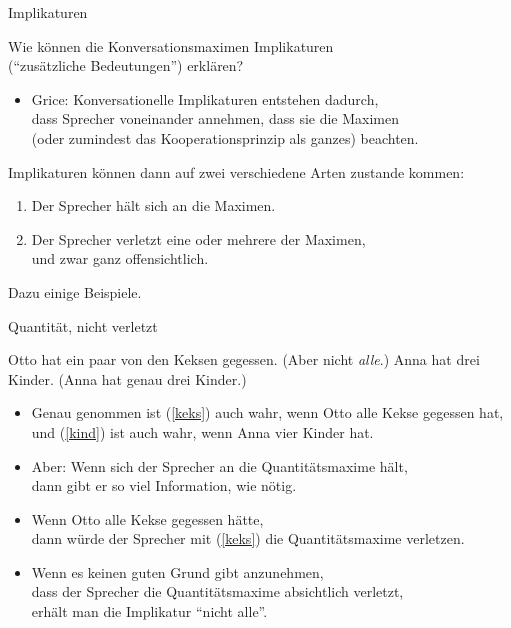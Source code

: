 \begin{frame}{Implikaturen}

Wie können die Konversationsmaximen Implikaturen\\ ("`zusätzliche Bedeutungen"') erklären?

\begin{itemize}
\item Grice: Konversationelle Implikaturen entstehen dadurch,\\
      dass Sprecher voneinander annehmen, dass sie die Maximen\\
     (oder zumindest das Kooperationsprinzip als ganzes) beachten.
\end{itemize}\pause

Implikaturen können dann auf zwei verschiedene Arten zustande kommen:

\begin{enumerate}
\item Der Sprecher hält sich an die Maximen.\pause
\item Der Sprecher verletzt eine oder mehrere der Maximen,\\ und zwar ganz offensichtlich.\pause
\end{enumerate}

Dazu einige Beispiele.

\end{frame}



\begin{frame}{Quantität, nicht verletzt}

 \begin{exe}
  \ex Otto hat ein paar von den Keksen gegessen. (\alert{Aber nicht \textit{alle}.})\label{keks}
  \ex Anna hat drei Kinder. (\alert{Anna hat genau drei Kinder.})\label{kind}
\end{exe}


\begin{itemize}
\item Genau genommen ist (\ref{keks}) auch wahr, wenn Otto alle Kekse gegessen hat, und  (\ref{kind}) ist auch wahr, wenn Anna vier Kinder hat.\pause
\item Aber: Wenn sich der Sprecher an die Quantitätsmaxime hält,\\ dann gibt er so viel Information, wie nötig.\pause
\item Wenn Otto alle Kekse gegessen hätte,\\ dann würde der Sprecher mit (\ref{keks}) die Quantitätsmaxime verletzen.\pause
\item Wenn es keinen guten Grund gibt anzunehmen,\\ dass der Sprecher die Quantitätsmaxime absichtlich verletzt,\\ erhält man die Implikatur "`nicht alle"'.
\end{itemize}


\end{frame}



